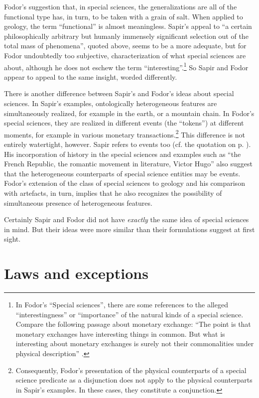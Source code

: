 \documentclass[output=paper]{langscibook}
\begin{document}
Fodor's suggestion that, in special sciences, the generalizations are all of the functional type has, in turn, to be taken with a grain of salt. When applied to geology, the term ``functional'' is almost meaningless. Sapir's appeal to ``a certain philosophically arbitrary but humanly immensely significant selection out of the total mass of phenomena'', quoted above, seems to be a more adequate, but for Fodor undoubtedly too subjective, characterization of what special sciences are about, although he does not eschew the term ``interesting''.\footnote{In Fodor's ``Special sciences'', there are some references to the alleged ``interestingness'' or ``importance'' of the natural kinds of a special science. Compare the following passage about monetary exchange: ``The point is that monetary exchanges have interesting things in common. But what is interesting about monetary exchanges is surely not their commonalities under physical description'' \citep[103--104]{Fodor1974}.} So Sapir and Fodor appear to appeal to the same insight, worded differently.

There is another difference between Sapir's and Fodor's ideas about special sciences. In Sapir's examples, ontologically heterogeneous features are simultaneously realized, for example in the earth, or a mountain chain. In Fodor's special sciences, they are realized in different events (the ``tokens'') at different moments, for example in various monetary transactions.\footnote{Consequently, Fodor's presentation of the physical counterparts of a special science predicate as a disjunction does not apply to the physical counterparts in Sapir's examples. In these cases, they constitute a conjunction.} This difference is not entirely watertight, however. Sapir refers to events too (cf. the quotation on p. \pageref{q:elffers:sapirquote}). His incorporation of history in the special sciences and examples such as ``the French Republic, the romantic movement in literature, Victor Hugo'' also suggest that the heterogeneous counterparts of special science entities may be events. Fodor's extension of the class of special sciences to geology and his comparison with artefacts, in turn, implies that he also recognizes the possibility of simultaneous presence of heterogeneous features.

Certainly Sapir and Fodor did not have \emph{exactly} the same idea of special sciences in mind. But their ideas were more similar than their formulations suggest at first sight.

\section{Laws and exceptions}
\label{sec:elffers:lawsexceptions}
\end{document}
